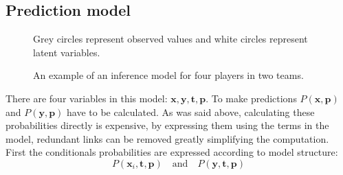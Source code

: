 \documentclass[12pt,a4paper]{book}
\newcommand\bs[1]{\boldsymbol{#1}}
\newcommand\note[1]{\vspace*{-0.5\baselineskip}\caption*{#1}}
\begin{document}
\subsection{Prediction model}
\begin{figure}[ht]
\centering
{}
\caption{An example of an inference model for four players in two teams.}
\note{Grey circles represent observed values and white circles represent latent variables.}
\label{fig:four-player-model}
\end{figure}
There are four variables in this model: $\bs{x},\bs{y},\bs{t},\bs{p}$.
To make predictions $P(\bs{x},\bs{p})$ and $P(\bs{y},\bs{p})$ have to be calculated.
As was said above, calculating these probabilities directly is expensive, by expressing them using the terms in the model, redundant links can be removed greatly simplifying the computation.
First the conditionals probabilities are expressed according to model structure:
\begin{equation*}
P(\bs{x}_i,\bs{t},\bs{p})\quad \text{and} \quad P(\bs{y},\bs{t},\bs{p})
\end{equation*}
\end{document}

